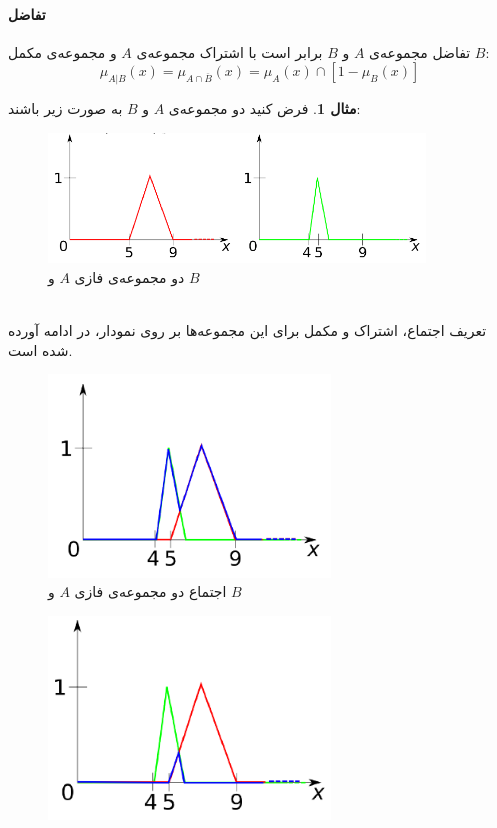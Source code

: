 \documentclass[12pt,a4paper]{article}
\theoremstyle{definition}
\newtheorem{exmp}{مثال}[section]
\begin{document}
 \paragraph{تفاضل}
 تفاضل مجموعه‌ی $A$ و $B$ برابر است با اشتراک مجموعه‌ی $A$ و مجموعه‌ی مکمل $B$:
 \begin{equation}\label{eq:e_fset_op_difference}
 \mu_{A|B}(x) = \mu_{A \cap \overline{B}}(x) = \mu_{A}(x) \cap [ 1 - \mu_{B}(x)]
 \end{equation}
\begin{exmp}
	فرض کنید دو مجموعه‌ی $A$ و $B$ به صورت زیر باشند:
\begin{figure}[h]
	\centering 
	\includegraphics[width=100mm]{Images/Fig8.png}
	\vspace{-0.5cm}
	\caption{دو مجموعه‌ی فازی $ A $ و $ B $} \label{fig:f_fset_op_exmp}
\end{figure}\\
تعریف اجتماع، اشتراک و مکمل برای این مجموعه‌ها بر روی نمودار، در ادامه آورده شده است. 
\begin{figure}[h]
	\centering 
	\includegraphics[width=75mm]{Images/Fig9.png}
	\vspace{-0.5cm}
	\caption{اجتماع دو مجموعه‌ی فازی $ A $ و $ B $} \label{fig:f_fset_op_exmp_union}
\end{figure}
\begin{figure}[h]
	\centering 
	\includegraphics[width=75mm]{Images/Fig10.png}

\end{figure}
\end{exmp}
\end{document}
